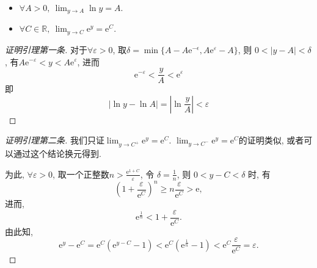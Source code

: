 \begin{lemma}\label{指数和对数的极限}
    \begin{itemize}
        \item $\displaystyle \forall A > 0,\ \lim_{y \to A} \ln y = A$.
        \item $\displaystyle \forall C \in \mathbb{R},\ \lim_{y \to C} \mathrm{e}^{y} = \mathrm{e}^{C}$.
    \end{itemize}
\end{lemma}
\begin{proof}[证明引理第一条]
    对于$\forall \varepsilon > 0$, 取$\delta = \min \{ A - A \mathrm{e}^{-\epsilon} , A \mathrm{e}^{\varepsilon} - A \}$, 则
    $0 < \left| y - A \right| < \delta$, 有$A \mathrm{e}^{- \varepsilon} < y < A \mathrm{e}^{\varepsilon}$, 进而
    \begin{equation}
      \mathrm{e}^{-\varepsilon} < \frac{y}{A} < \mathrm{e}^{\varepsilon}
    \end{equation}
    即
    \begin{equation}
      \left| \ln y - \ln A \right| = \left| \ln \frac{y}{A} \right| < \varepsilon
    \end{equation}
\end{proof}

\begin{proof}[证明引理第二条]
    我们只证$\displaystyle \lim_{y \to C^{+}} \mathrm{e}^{y} = \mathrm{e}^{C}$. $\displaystyle \lim_{y \to C^{-}} \mathrm{e}^{y} = \mathrm{e}^{C}$的证明类似, 或者可以通过这个结论换元得到.
    
    为此, $\forall \varepsilon > 0$, 取一个正整数$n > \frac{\mathrm{e}^{1+C}}{\varepsilon} $, 令 $\delta = \frac{1}{n}$, 则 $0 < y - C < \delta$ 时, 有
    \begin{equation}
      \left( 1 + \frac{\varepsilon}{\mathrm{e}^{C}} \right) ^{n} \ge n \frac{\varepsilon}{\mathrm{e}^{C}} > \mathrm{e},
    \end{equation}
    进而, 
    \begin{equation}
      \mathrm{e}^{\frac{1}{n}} < 1 + \frac{\varepsilon}{\mathrm{e}^{C}}.
    \end{equation}
    由此知,
    \begin{equation}
      \mathrm{e}^{y} - \mathrm{e}^{C} = \mathrm{e}^{C} \left( \mathrm{e}^{y-C} - 1 \right) < \mathrm{e}^{C} \left( \mathrm{e}^{\frac{1}{n}} - 1 \right) < \mathrm{e}^{C} \frac{\varepsilon}{\mathrm{e}^{C}} = \varepsilon.
    \end{equation}
\end{proof}

